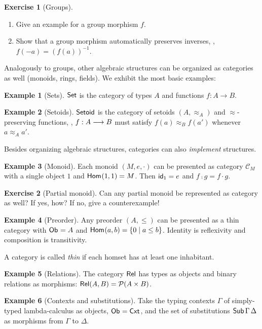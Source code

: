 \documentclass[a4paper,fleqn]{scrartcl}
\theoremstyle{definition}
\newtheorem{example}{Example}
\newtheorem{exercise}{Exercise}
\newcommand{\Cxt}{\mathsf{Cxt}}
\newcommand{\C}{\mathcal{C}}
\begin{document}
\begin{exercise}[Groups] \bla
  \begin{enumerate}
  \item
  Give an example for a group morphism $f$.
  \item
  Show that a group morphism automatically preserves inverses, \ie,
  $f(-a) = (f(a))^{-1}$.
  \end{enumerate}
\end{exercise}
Analogously to groups, other algebraic structures can be organized as
categories as well (monoids, rings, fields).  We exhibit the most
basic examples:
\begin{example}[Sets]
  $\Set$ is the category of types $A$ and functions $f : A \to B$.
\end{example}
\begin{example}[Setoids]
  $\Setoid$ is the category of setoids $(A,\approx_A)$ and
  $\approx$-preserving functions, \ie, $f : A \too B$ must satisfy
  $f(a) \approx_B f(a')$ whenever $a \approx_A a'$.
\end{example}

Besides organizing algebraic structures, categories can also
\emph{implement} structures.
\begin{example}[Monoid]
  Each monoid $(M,e,\cdot)$ can be presented as category $\C_M$ with a
  single object $1$ and $\Hom(1,1)=M$.  Then $\id[1] = e$ and $f \comp
  g = f \cdot g$.
\end{example}
\begin{exercise}[Partial monoid]
  \label{ex:pmon}
  Can any partial monoid be represented as category as well?  If yes,
  how?  If no, give a counterexample!
\end{exercise}
\begin{example}[Preorder]
  Any preorder $(A,\leq)$ can be presented as a thin category with $\Ob =
  A$ and $\Hom(a,b) = \{ 0 \mid a \leq b \}$.  Identity is reflexivity
  and composition is transitivity.

  A category is called \emph{thin} if each homset has at least one inhabitant.
\end{example}
\begin{example}[Relations]
  The category $\Rel$ has types as objects and binary relations as
  morphisms: $\Rel(A,B) = \Pot(A \times B)$.
\end{example}
\begin{example}[Contexts and substitutions]
  Take the typing contexts $\Gamma$ of simply-typed lambda-calculus
  as objects, $\Ob = \Cxt$, and the set of substitutions
  $\Sub\,\GG\,\GD$ as morphisms from $\Gamma$ to $\Delta$.
\end{example}
\end{document}
